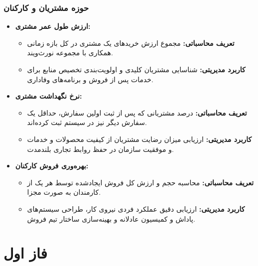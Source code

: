\documentclass[14pt,a4paper]{extarticle}
\begin{document}
	\subsubsection{حوزه مشتریان و کارکنان}
	\begin{itemize}
		\item \textbf{ارزش طول عمر مشتری:}
		\begin{itemize}
			\item \textbf{تعریف محاسباتی:} مجموع ارزش خریدهای یک مشتری در کل بازه زمانی همکاری با مجموعه نورث‌ویند.
			\item \textbf{کاربرد مدیریتی:} شناسایی مشتریان کلیدی و اولویت‌بندی تخصیص منابع برای خدمات پس از فروش و برنامه‌های وفاداری.
		\end{itemize}
		
		\item \textbf{نرخ نگهداشت مشتری:}
		\begin{itemize}
			\item \textbf{تعریف محاسباتی:} درصد مشتریانی که پس از ثبت اولین سفارش، حداقل یک سفارش دیگر نیز در سیستم ثبت کرده‌اند.
			\item \textbf{کاربرد مدیریتی:} ارزیابی میزان رضایت مشتریان از کیفیت محصولات و خدمات و موفقیت سازمان در حفظ روابط تجاری بلندمدت.
		\end{itemize}
		
		\item \textbf{بهره‌وری فروش کارکنان:}
		\begin{itemize}
			\item \textbf{تعریف محاسباتی:} محاسبه حجم و ارزش کل فروش ایجادشده توسط هر یک از کارمندان به صورت مجزا.
			\item \textbf{کاربرد مدیریتی:} ارزیابی دقیق عملکرد فردی نیروی کار، طراحی سیستم‌های پاداش و کمیسیون عادلانه و بهینه‌سازی ساختار تیم فروش.
		\end{itemize}
	\end{itemize}
	
	
	
	
	\newpage
	\section{فاز اول}
\end{document}
